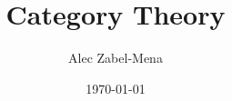 \documentclass[12pt, twoside]{book}
\title{Category Theory}
\author{Alec Zabel-Mena}
\date{\today}
\begin{document}
\maketitle
\tableofcontents
\newpage



\nocite{*}



\end{document}
